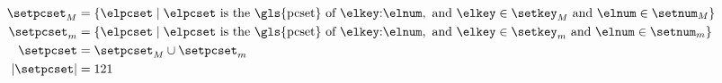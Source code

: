 

\begin{equation}
    \label{eq:pcsets}
    \begin{split}
    \setpcset_M &= \{ \elpcset \mid \elpcset \text{ is the \gls{pcset} of }
    \elkey\text{:}\elnum, \text{ and }
    \elkey \in \setkey_M \text{ and } \elnum \in \setnum_M  \} \\
    \setpcset_m &= \{ \elpcset \mid \elpcset \text{ is the \gls{pcset} of }
    \elkey\text{:}\elnum, \text{ and }
    \elkey \in \setkey_m \text{ and } \elnum \in \setnum_m  \} \\
    \setpcset &= \setpcset_M \cup \setpcset_m \\
    | \setpcset | &= 121 \\    
    \end{split}
\end{equation}

